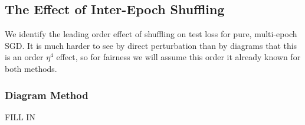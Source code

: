\documentclass{article}
\begin{document}

    \subsection*{The Effect of Inter-Epoch Shuffling}
        We identify the leading order effect of shuffling on test loss for
        pure, multi-epoch SGD.  It is much harder to see by direct perturbation
        than by diagrams that this is an order $\eta^4$ effect, so for fairness
        we will assume this order it already known for both methods.

        \subsubsection*{Diagram Method}

            {\color{moor} FILL IN}
            
\end{document}
